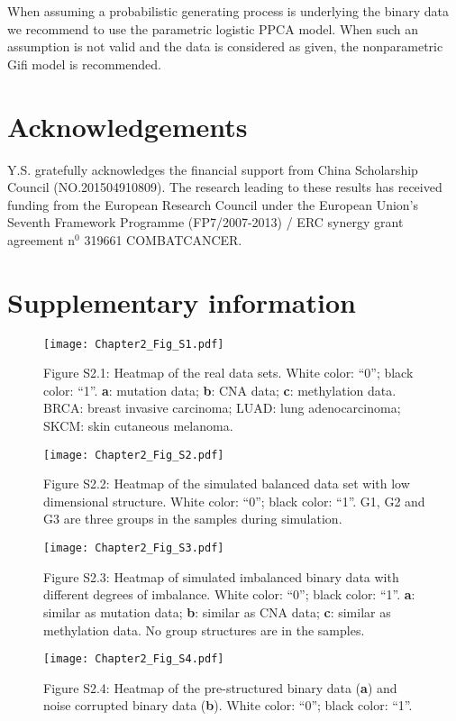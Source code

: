 When assuming a probabilistic generating process is underlying the binary data we recommend to use the parametric logistic PPCA model. When such an assumption is not valid and the data is considered as given, the nonparametric Gifi model is recommended.

\section*{Acknowledgements}
Y.S. gratefully acknowledges the financial support from China Scholarship Council (NO.201504910809). The research leading to these results has received funding from the European Research Council under the European Union's Seventh Framework Programme (FP7/2007-2013) / ERC synergy grant agreement $\text{n}^{0}$ 319661 COMBATCANCER.

\clearpage
\section{Supplementary information}
\begin{figure}[htbp]
    \centering
    \texttt{[image: Chapter2\_Fig\_S1.pdf]}
    \label{chapter2_fig:S1}
    \caption*{Figure S2.1: Heatmap of the real data sets. White color: ``0''; black color: ``1''. \textbf{a}: mutation data; \textbf{b}: CNA data; \textbf{c}: methylation data. BRCA: breast invasive carcinoma; LUAD: lung adenocarcinoma; SKCM: skin cutaneous melanoma.}
\end{figure}

\begin{figure}[htbp]
    \centering
    \texttt{[image: Chapter2\_Fig\_S2.pdf]}
    \caption*{Figure S2.2: Heatmap of the simulated balanced data set with low dimensional structure. White color: ``0''; black color: ``1''. G1, G2 and G3 are three groups in the samples during simulation.}
    \label{chapter2_fig:S2}
\end{figure}

\begin{figure}[htbp]
    \centering
    \texttt{[image: Chapter2\_Fig\_S3.pdf]}
    \caption*{Figure S2.3: Heatmap of simulated imbalanced binary data with different degrees of imbalance. White color: ``0''; black color: ``1''. \textbf{a}: similar as mutation data; \textbf{b}: similar as CNA data; \textbf{c}: similar as methylation data. No group structures are in the samples.}
    \label{chapter2_fig:S3}
\end{figure}

\begin{figure}[htbp]
    \centering
    \texttt{[image: Chapter2\_Fig\_S4.pdf]}
    \caption*{Figure S2.4: Heatmap of the pre-structured binary data (\textbf{a}) and noise corrupted binary data (\textbf{b}). White color: ``0''; black color: ``1''.}
    \label{chapter2_fig:S4}
\end{figure}




